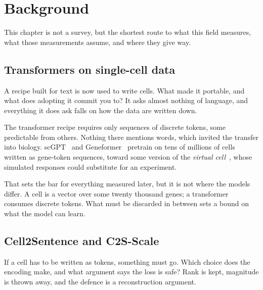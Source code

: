
\chapter{Background}
\label{sec:litreview}

\noindent
This chapter is not a survey, but the shortest route to what this field measures,
what those measurements assume, and where they give way.

\section{Transformers on single-cell data}
\label{sec:lit-foundation}
\framedecl{-}

\begin{question}
A recipe built for text is now used to write cells. What made it portable, and
what does adopting it commit you to? It asks almost nothing of language, and
everything it does ask falls on how the data are written down.
\end{question}

\noindent
The transformer recipe requires only sequences of discrete tokens, some
predictable from others. Nothing there mentions words, which invited the transfer
into biology. scGPT~\cite{scgpt} and Geneformer~\cite{geneformer} pretrain on
tens of millions of cells written as gene-token sequences, toward some version of
the \emph{virtual cell}~\cite{bunne}, whose simulated responses could substitute
for an experiment.

That sets the bar for everything measured later, but it is not where the models
differ. A cell is a vector over some twenty thousand genes; a transformer
consumes discrete tokens. What must be discarded in between sets a bound on what the model can learn.

\section{Cell2Sentence and C2S-Scale}
\label{sec:lit-c2s}
\framedecl{-}

\begin{question}
If a cell has to be written as tokens, something must go. Which choice does the
encoding make, and what argument says the loss is safe? Rank is kept, magnitude
is thrown away, and the defence is a reconstruction argument.
\end{question}

